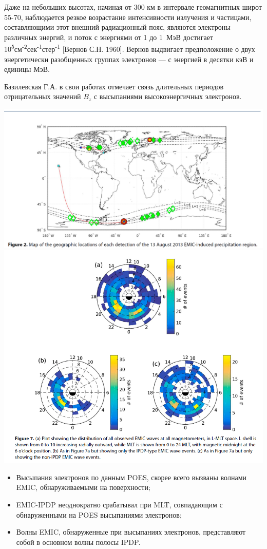\documentclass[t, aspectratio=43]{beamer}
\begin{document}
\begin{frame}	
\frametitle{\insertsection} 

{\tiny Даже на небольших высотах, начиная от 300 км в интервале геомагнитных широт 55-70, наблюдается резкое возрастание интенсивности излучения и частицами, составляющими этот внешний радиационный пояс, являются электроны различных энергий, и поток  с энергиями от 1 до 1~МэВ достигает 10\textsuperscript{5}см\textsuperscript{-2}сек\textsuperscript{-1}стер\textsuperscript{-1} [Вернов С.Н. 1960].  Вернов выдвигает предположение о двух энергетически разобщенных группах электронов --- с энергией в десятки кэВ и единицы МэВ. 
	
Базилевская Г.А. в свои работах отмечает связь длительных периодов отрицательных значений $ B_z $ с высыпаниями высокоэнергичных электронов.

 \includegraphics[width=0.6\linewidth]{images/poesemic}
	\includegraphics[width=0.4\linewidth]{mltrep}

 
\begin{itemize}
	\item Высыпания электронов по данным POES, скорее всего вызваны волнами EMIC, обнаруживаемыми на поверхности;
	\item EMIC-IPDP неоднократно срабатывал при  MLT,  совпадающим с обнаруженными на POES  высыпаниями электронов;
	\item Волны EMIC, обнаруженные при  высыпаниях электронов, представляют собой в основном волны полосы IPDP.
\end{itemize}
}
\end{frame}
	
\end{document}
